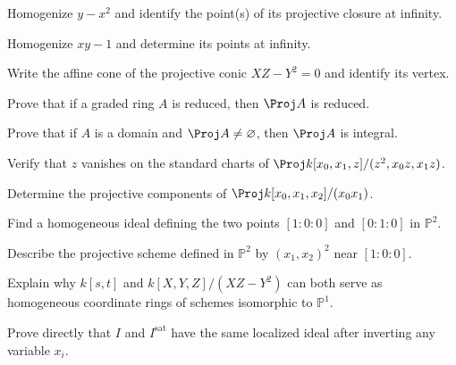 \begin{exercise}\label{exr:vi37-12}
Homogenize \(y-x^2\) and identify the point(s) of its projective closure at infinity.
\end{exercise}
\begin{exercise}\label{exr:vi37-13}
Homogenize \(xy-1\) and determine its points at infinity.
\end{exercise}
\begin{exercise}\label{exr:vi37-14}
Write the affine cone of the projective conic \(XZ-Y^2=0\) and identify its vertex.
\end{exercise}
\begin{exercise}\label{exr:vi37-15}
Prove that if a graded ring \(A\) is reduced, then \(\Proj A\) is reduced.
\end{exercise}
\begin{exercise}\label{exr:vi37-16}
Prove that if \(A\) is a domain and \(\Proj A\ne\varnothing\), then \(\Proj A\) is integral.
\end{exercise}
\begin{exercise}\label{exr:vi37-17}
Verify that \(z\) vanishes on the standard charts of \(\Proj k[x_0,x_1,z]/(z^2,x_0z,x_1z)\).
\end{exercise}
\begin{exercise}[Components]\label{exr:vi37-18}
Determine the projective components of \(\Proj k[x_0,x_1,x_2]/(x_0x_1)\).
\end{exercise}
\begin{exercise}\label{exr:vi37-19}
Find a homogeneous ideal defining the two points \([1:0:0]\) and \([0:1:0]\) in \(\mathbb P^2\).
\end{exercise}
\begin{exercise}\label{exr:vi37-20}
Describe the projective scheme defined in \(\mathbb P^2\) by \((x_1,x_2)^2\) near \([1:0:0]\).
\end{exercise}
\begin{exercise}\label{exr:vi37-21}
Explain why \(k[s,t]\) and \(k[X,Y,Z]/(XZ-Y^2)\) can both serve as homogeneous coordinate rings of schemes isomorphic to \(\mathbb P^1\).
\end{exercise}
\begin{exercise}\label{exr:vi37-22}
Prove directly that \(I\) and \(I^{\mathrm{sat}}\) have the same localized ideal after inverting any variable \(x_i\).
\end{exercise}
